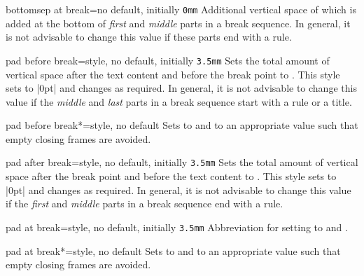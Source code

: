 \begin{docTcbKey}{bottomsep at break}{=}{no default, initially \texttt{0mm}}
  Additional vertical space of  which is added at the bottom of
  \emph{first} and \emph{middle} parts in a break sequence.
  In general, it is not advisable to change this value if these parts end with a rule.
\end{docTcbKey}

\begin{docTcbKey}{pad before break}{=}{style, no default, initially \texttt{3.5mm}}
  Sets the total amount of vertical space after the text content and before the
  break point to . This style sets  to |0pt|
  and changes  as required.
  In general, it is not advisable to change this value if the
  \emph{middle} and \emph{last} parts in a break sequence start with a rule or a title.
\end{docTcbKey}

\begin{docTcbKey}{pad before break*}{=}{style, no default}
  Sets  to  and
   to an appropriate value such that
  empty closing frames are avoided.
\end{docTcbKey}

\begin{docTcbKey}{pad after break}{=}{style, no default, initially \texttt{3.5mm}}
  Sets the total amount of vertical space after the break point and before the
  text content to . This style sets  to |0pt|
  and changes  as required.
  In general, it is not advisable to change this value if the
  \emph{first} and \emph{middle} parts in a break sequence end with a rule.
\end{docTcbKey}

\begin{docTcbKey}{pad at break}{=}{style, no default, initially \texttt{3.5mm}}
  Abbreviation for setting  to 
  and .
\end{docTcbKey}

\enlargethispage*{10mm}

\begin{docTcbKey}{pad at break*}{=}{style, no default}
  Sets  to  and
   to an appropriate value such that
  empty closing frames are avoided.
\end{docTcbKey}

